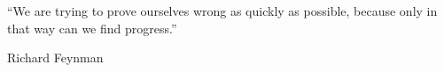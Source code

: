 \documentclass[a4paper, 11pt, oneside]{Thesis}  %
\begin{document}


 
 
 
 
 
 
 
 

\pagestyle{empty}  %

\null\vfill
“We are trying to prove ourselves wrong as quickly as possible, because only in that way can we find progress.” 
\begin{flushright}
Richard Feynman
\end{flushright}
\end{document}
